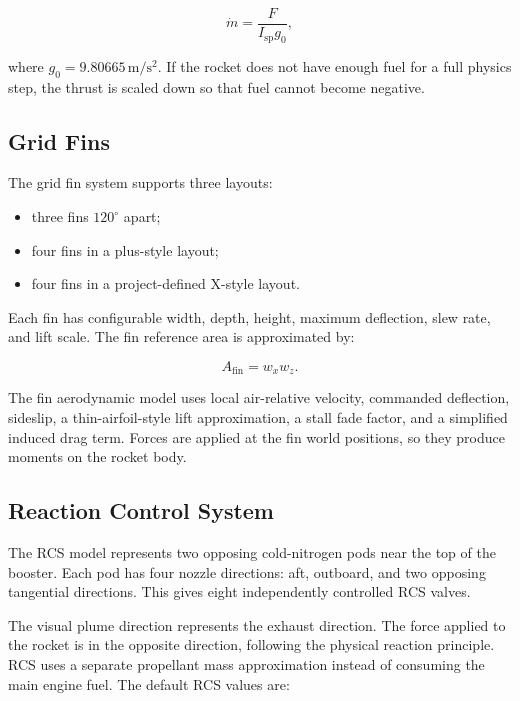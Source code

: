 \documentclass{article}
\begin{document}
\begin{equation}
\dot{m} = \frac{F}{I_{\mathrm{sp}}g_0},
\end{equation}

where \(g_0 = 9.80665\,\mathrm{m/s^2}\). If the rocket does not have enough fuel for a full physics step, the thrust is scaled down so that fuel cannot become negative.

\subsection{Grid Fins}

The grid fin system supports three layouts:

\begin{itemize}
    \item three fins \(120^\circ\) apart;
    \item four fins in a plus-style layout;
    \item four fins in a project-defined X-style layout.
\end{itemize}

Each fin has configurable width, depth, height, maximum deflection, slew rate, and lift scale. The fin reference area is approximated by:

\begin{equation}
A_{\mathrm{fin}} = w_x w_z.
\end{equation}

The fin aerodynamic model uses local air-relative velocity, commanded deflection, sideslip, a thin-airfoil-style lift approximation, a stall fade factor, and a simplified induced drag term. Forces are applied at the fin world positions, so they produce moments on the rocket body.

\subsection{Reaction Control System}

The RCS model represents two opposing cold-nitrogen pods near the top of the booster. Each pod has four nozzle directions: aft, outboard, and two opposing tangential directions. This gives eight independently controlled RCS valves.

The visual plume direction represents the exhaust direction. The force applied to the rocket is in the opposite direction, following the physical reaction principle. RCS uses a separate propellant mass approximation instead of consuming the main engine fuel. The default RCS values are:
\end{document}
